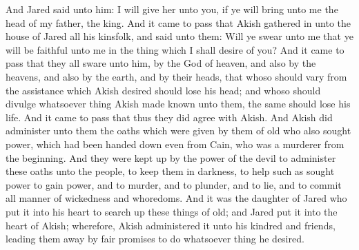 And Jared said unto him: I will give her unto you, if ye will bring unto me the head of my father, the king.
\bverse \iffalse And it came to pass that Akish gathered in unto the house of Jared all his kinsfolk, and said unto them: Will ye swear unto me that ye will be faithful unto me in the thing which I shall desire of you? \fi
And it came to pass that Akish gathered in unto the house of Jared all his kinsfolk, and said unto them: Will ye swear unto me that ye will be faithful unto me in the thing which I shall desire of you?
\bverse \iffalse And it came to pass that they all sware unto him, by the God of heaven, and also by the heavens, and also by the earth, and by their heads, that whoso should vary from the assistance which Akish desired should lose his head; and whoso should divulge whatsoever thing Akish made known unto them, the same should lose his life. \fi
And it came to pass that they all sware unto him, by the God of heaven, and also by the heavens, and also by the earth, and by their heads, that whoso should vary from the assistance which Akish desired should lose his head; and whoso should divulge whatsoever thing Akish made known unto them, the same should lose his life.
\bverse \iffalse And it came to pass that thus they did agree with Akish. And Akish did administer unto them the oaths which were given by them of old who also sought power, which had been handed down even from Cain, who was a murderer from the beginning. \fi
And it came to pass that thus they did agree with Akish. And Akish did administer unto them the oaths which were given by them of old who also sought power, which had been handed down even from Cain, who was a murderer from the beginning.
\bverse \iffalse And they were kept up by the power of the devil to administer these oaths unto the people, to keep them in darkness, to help such as sought power to gain power, and to murder, and to plunder, and to lie, and to commit all manner of wickedness and whoredoms. \fi
And they were kept up by the power of the devil to administer these oaths unto the people, to keep them in darkness, to help such as sought power to gain power, and to murder, and to plunder, and to lie, and to commit all manner of wickedness and whoredoms.
\bverse \iffalse And it was the daughter of Jared who put it into his heart to search up these things of old; and Jared put it into the heart of Akish; wherefore, Akish administered it unto his kindred and friends, leading them away by fair promises to do whatsoever thing he desired. \fi
And it was the daughter of Jared who put it into his heart to search up these things of old; and Jared put it into the heart of Akish; wherefore, Akish administered it unto his kindred and friends, leading them away by fair promises to do whatsoever thing he desired.
